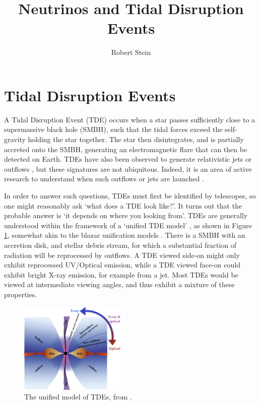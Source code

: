 \documentclass[a4paper,11pt]{article}
\title{Neutrinos and Tidal Disruption Events}
\author*[a, b]{Robert Stein}
\affiliation[a]{Deutsches Elektronen-Synchrotron DESY: Zeuthen, Germany}
\affiliation[b]{Institut f\"ur Physik, Humboldt-Universit\"t zu Berlin: Berlin, Germany}
\begin{document}
\maketitle


\section{Tidal Disruption Events}

A Tidal Disruption Event (TDE) occurs when a star passes sufficiently close to a supermassive black hole (SMBH), such that the tidal forces exceed the self-gravity holding the star together. The star then disintegrates, and is partially accreted onto the SMBH, generating an electromagnetic flare that can then be detected on Earth. TDEs have also been observed to generate relativistic jets \cite{swift_j1644_11} or outflows \cite{alexander_16}, but these signatures are not ubiquitous. Indeed, it is an area of active research to understand when such outflows or jets are launched \cite{radio_tde_summary}.

In order to answer such questions, TDEs must first be identified by telescopes, so one might reasonably ask `what does a TDE look like?'. It turns out that the probable answer is `it depends on where you looking from'. TDEs are generally understood within the framework of a `unified TDE model' \cite{dai_18}, as shown in Figure \ref{fig:tde_dai}, somewhat akin to the blazar unification models \cite{95_agn_unification}. There is a SMBH with an accretion disk, and stellar debris stream, for which a substantial fraction of radiation will be reprocessed by outflows. A TDE viewed side-on might only exhibit reprocessed UV/Optical emission, while a TDE viewed face-on could exhibit bright X-ray emission, for example from a jet. Most TDEs would be viewed at intermediate viewing angles, and thus exhibit a mixture of these properties.

\begin{figure}[!ht]
	\centering \includegraphics[width=0.45\textwidth]{figures/dai_unified_model}
	\caption{The unified model of TDEs, from \cite{dai_18}.}
	\label{fig:tde_dai}
\end{figure}
\end{document}

